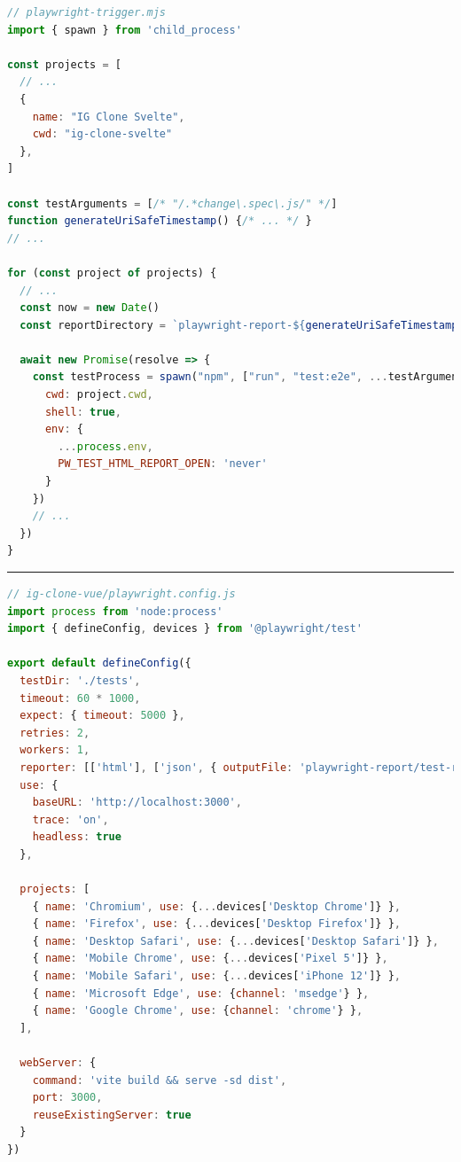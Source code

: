 \documentclass[a4paper, 12pt]{article}
\begin{document}
\vspace{1cm}
\begin{lstlisting}[caption={Trigger script for Playwright tests}, label={lst:playwright-trigger}, language=JavaScript]
// playwright-trigger.mjs
import { spawn } from 'child_process'

const projects = [
  // ...
  {
    name: "IG Clone Svelte",
    cwd: "ig-clone-svelte"
  },
]

const testArguments = [/* "/.*change\.spec\.js/" */]
function generateUriSafeTimestamp() {/* ... */ }
// ...

for (const project of projects) {
  // ...
  const now = new Date()
  const reportDirectory = `playwright-report-${generateUriSafeTimestamp()}`

  await new Promise(resolve => {
    const testProcess = spawn("npm", ["run", "test:e2e", ...testArguments], {
      cwd: project.cwd,
      shell: true,
      env: {
        ...process.env,
        PW_TEST_HTML_REPORT_OPEN: 'never'
      }
    })
    // ...
  })
}
\end{lstlisting}
\hrule
\begin{lstlisting}[caption={Playwright configuration for Vue.js}, label={lst:playwright-config}, language=JavaScript]
// ig-clone-vue/playwright.config.js
import process from 'node:process'
import { defineConfig, devices } from '@playwright/test'

export default defineConfig({
  testDir: './tests',
  timeout: 60 * 1000,
  expect: { timeout: 5000 },
  retries: 2,
  workers: 1,
  reporter: [['html'], ['json', { outputFile: 'playwright-report/test-results.json' }]],
  use: {
    baseURL: 'http://localhost:3000',
    trace: 'on',
    headless: true
  },

  projects: [
    { name: 'Chromium', use: {...devices['Desktop Chrome']} },
    { name: 'Firefox', use: {...devices['Desktop Firefox']} },
    { name: 'Desktop Safari', use: {...devices['Desktop Safari']} },
    { name: 'Mobile Chrome', use: {...devices['Pixel 5']} },
    { name: 'Mobile Safari', use: {...devices['iPhone 12']} },
    { name: 'Microsoft Edge', use: {channel: 'msedge'} },
    { name: 'Google Chrome', use: {channel: 'chrome'} },
  ],

  webServer: {
    command: 'vite build && serve -sd dist',
    port: 3000,
    reuseExistingServer: true
  }
})

\end{lstlisting}
\vspace{1cm}
\end{document}
